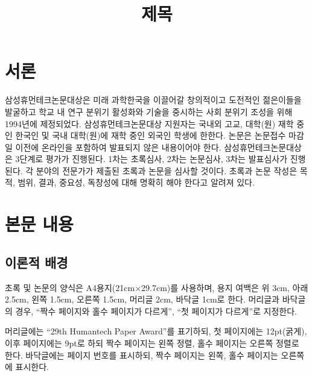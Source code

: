 \documentclass{humantech}
\title{제목} %
\begin{document}

\section{서론}
삼성휴먼테크논문대상은 미래 과학한국을 이끌어갈 창의적이고 도전적인 젊은이들을 발굴하고 학교 내 연구 분위기 활성화와 기술을 중시하는 사회 분위기 조성을 위해 1994년에 제정되었다. 삼성휴먼테크논문대상 지원자는 국내외 고교, 대학(원) 재학 중인 한국인 및 국내 대학(원)에 재학 중인 외국인 학생에 한한다. 논문은 논문접수 마감일 이전에 온라인을 포함하여 발표되지 않은 내용이어야 한다. 삼성휴먼테크논문대상은 3단계로 평가가 진행된다. 1차는 초록심사, 2차는 논문심사, 3차는 발표심사가 진행된다. 각 분야의 전문가가 제출된 초록과 논문을 심사할 것이다. 초록과 논문 작성은 목적, 범위, 결과, 중요성, 독창성에 대해 명확히 해야 한다고 알려져 있다.

\section{본문 내용}
\subsection{이론적 배경}
초록 및 논문의 양식은 A4용지(21cm×29.7cm)를 사용하며, 용지 여백은 위 3cm, 아래 2.5cm, 왼쪽 1.5cm, 오른쪽 1.5cm, 머리글 2cm, 바닥글 1cm로 한다. 머리글과 바닥글의 경우, ``짝수 페이지와 홀수 페이지가 다르게'', ``첫 페이지가 다르게''로 지정한다.

머리글에는 ``29th Humantech Paper Award''를 표기하되, 첫 페이지에는 12pt(굵게), 이후 페이지에는 9pt로 하되 짝수 페이지는 왼쪽 정렬, 홀수 페이지는 오른쪽 정렬로 한다. 바닥글에는 페이지 번호를 표시하되, 짝수 페이지는 왼쪽, 홀수 페이지는 오른쪽에 표시한다.
\end{document}
